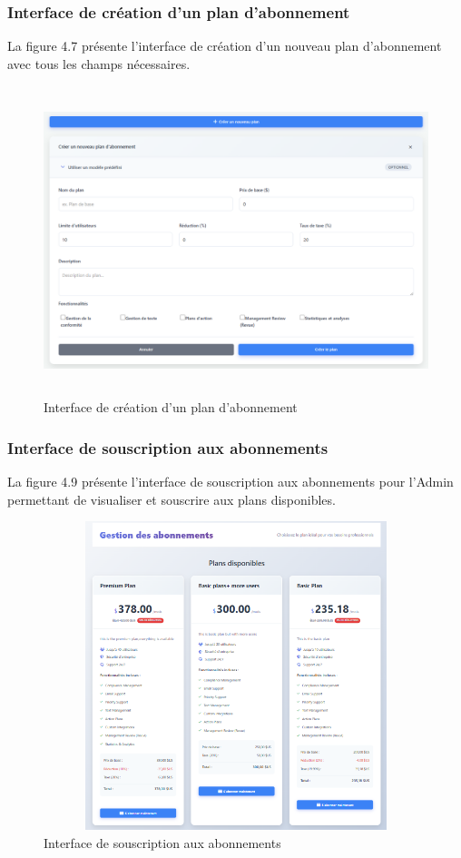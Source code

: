 \subsubsection{Interface de création d'un plan d'abonnement}
\noindent La figure 4.7 présente l'interface de création d'un nouveau plan d'abonnement avec tous les champs nécessaires.

\begin{figure}[H]
    \centering
    \includegraphics[width=13cm,height=9cm]{images/createplanmodal.PNG}
    \caption{Interface de création d'un plan d'abonnement}
\end{figure}

\subsubsection{Interface de souscription aux abonnements}
\noindent La figure 4.9 présente l'interface de souscription aux abonnements pour l'Admin permettant de visualiser et souscrire aux plans disponibles.

\begin{figure}[H]
    \centering
    \includegraphics[width=13cm,height=9cm]{images/subscriptioninterface.PNG}
    \caption{Interface de souscription aux abonnements}
\end{figure}

